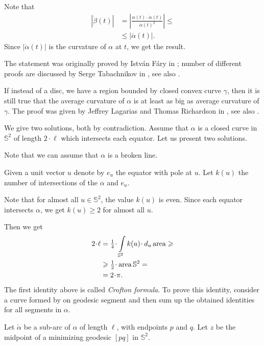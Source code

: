Note that 
\begin{align*}
|\dot\beta(t)|&=|\tfrac{\alpha(t)\cdot\ddot\alpha(t)}{\dot\alpha(t)^2}|\le
\\
&\le|\ddot\alpha(t)|.
\end{align*}
Since $|\ddot\alpha(t)|$ is the curvature of $\alpha$ at $t$,
we get the result.\qeds

The statement was originally proved 
by Istv\'an F\'ary in \cite{fary};
number of different proofs are discussed by Serge Tabachnikov in \cite{tabachnikov}, see also \cite[19.5 in ][]{fuchs-tabachnikov}.

If instead of a disc, 
we have a region bounded by closed convex curve $\gamma$, 
then it is still true that the average curvature of $\alpha$ is at least as big as average curvature of $\gamma$. 
The proof was given by Jeffrey Lagarias
and Thomas Richardson in \cite{lagarias-richardson}, see also \cite{nazarov-petrov}.


We give two solutions, both by contradiction.
Assume that $\alpha$ is a closed curve in $\mathbb{S}^2$ of length $2\cdot\ell$ which intersects each equator.
Let us present two solutions.

Note that we can assume that $\alpha$ is a broken line.

Given a unit vector $u$ denote by $e_u$ the equator with pole at $u$.
Let $k(u)$ the number of intersections
of the $\alpha$ and $e_u$.

Note that for almost all $u\in \mathbb{S}^2$, the value $k(u)$ is even.
Since each equator intersects $\alpha$, we get $k(u)\ge 2$ for almost all $u$.

Then we get
\begin{align*}
2\cdot\ell&=\tfrac14\cdot\int\limits_{\mathbb{S}^2}k(u)\cdot\, d_u\area\ge 
\\
&\ge\tfrac12\cdot\area\mathbb{S}^2=
\\
&=2\cdot\pi.
\end{align*}
The first identity above is called \emph{Crofton formula}.
To prove this identity, consider a curve formed by on geodesic segment
and
then sum up the obtained identities for all segments in $\alpha$.\qeds

Let $\check\alpha$ be a sub-arc of $\alpha$ of length $\ell$, with endpoints $p$ and $q$.  
Let $z$ be the midpoint of a minimizing geodesic $[pq]$ in $\mathbb{S}^2$.  


